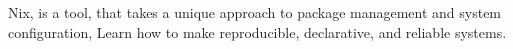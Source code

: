 \documentclass{article}
\begin{document}
Nix, is a tool, that takes a unique approach to package management and system configuration, Learn how to make reproducible, declarative, and reliable systems.
\end{document}
